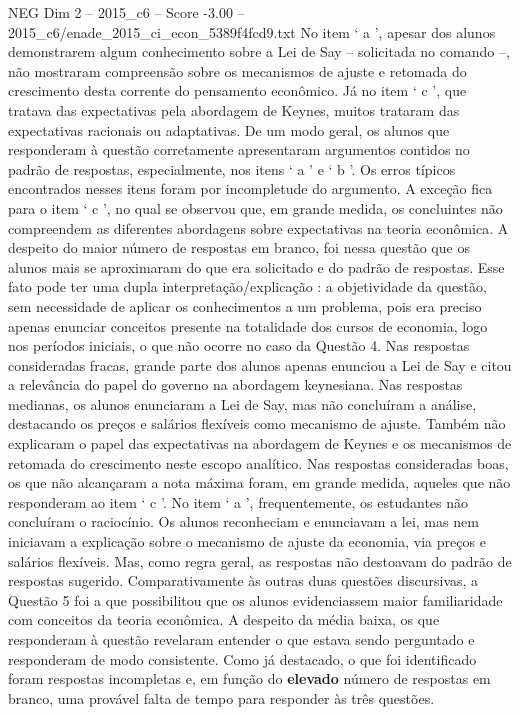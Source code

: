 \begin{textsample}{NEG Dim 2 – 2015\_c6 – Score -3.00 – 2015\_c6/enade\_2015\_ci\_econ\_5389f4fcd9.txt}
No item ‘ a ’, apesar dos alunos demonstrarem algum conhecimento sobre a Lei de Say – solicitada no comando –, não mostraram compreensão sobre os mecanismos de ajuste e retomada do crescimento desta corrente do pensamento econômico.
Já no item ‘ c ’, que tratava das expectativas pela abordagem de Keynes, muitos trataram das expectativas racionais ou adaptativas.
De um modo geral, os alunos que responderam à questão corretamente apresentaram argumentos contidos no padrão de respostas, especialmente, nos itens ‘ a ’ e ‘ b ’.
Os erros típicos encontrados nesses itens foram por incompletude do argumento.
A exceção fica para o item ‘ c ’, no qual se observou que, em grande medida, os concluintes não compreendem as diferentes abordagens sobre expectativas na teoria econômica.
A despeito do maior número de respostas em branco, foi nessa questão que os alunos mais se aproximaram do que era solicitado e do padrão de respostas.
Esse fato pode ter uma dupla interpretação/explicação : a objetividade da questão, sem necessidade de aplicar os conhecimentos a um problema, pois era preciso apenas enunciar conceitos presente na totalidade dos cursos de economia, logo nos períodos iniciais, o que não ocorre no caso da Questão 4.
Nas respostas consideradas fracas, grande parte dos alunos apenas enunciou a Lei de Say e citou a relevância do papel do governo na abordagem keynesiana.
Nas respostas medianas, os alunos enunciaram a Lei de Say, mas não concluíram a análise, destacando os preços e salários flexíveis como mecanismo de ajuste.
Também não explicaram o papel das expectativas na abordagem de Keynes e os mecanismos de retomada do crescimento neste escopo analítico.
Nas respostas consideradas boas, os que não alcançaram a nota máxima foram, em grande medida, aqueles que não responderam ao item ‘ c ’.
No item ‘ a ’, frequentemente, os estudantes não concluíram o raciocínio.
Os alunos reconheciam e enunciavam a lei, mas nem iniciavam a explicação sobre o mecanismo de ajuste da economia, via preços e salários flexíveis.
Mas, como regra geral, as respostas não destoavam do padrão de respostas sugerido.
Comparativamente às outras duas questões discursivas, a Questão 5 foi a que possibilitou que os alunos evidenciassem maior familiaridade com conceitos da teoria econômica.
A despeito da média baixa, os que responderam à questão revelaram entender o que estava sendo perguntado e responderam de modo consistente.
Como já destacado, o que foi identificado foram respostas incompletas e, em função do \textbf{elevado} número de respostas em branco, uma provável falta de tempo para responder às três questões.

\end{textsample}
